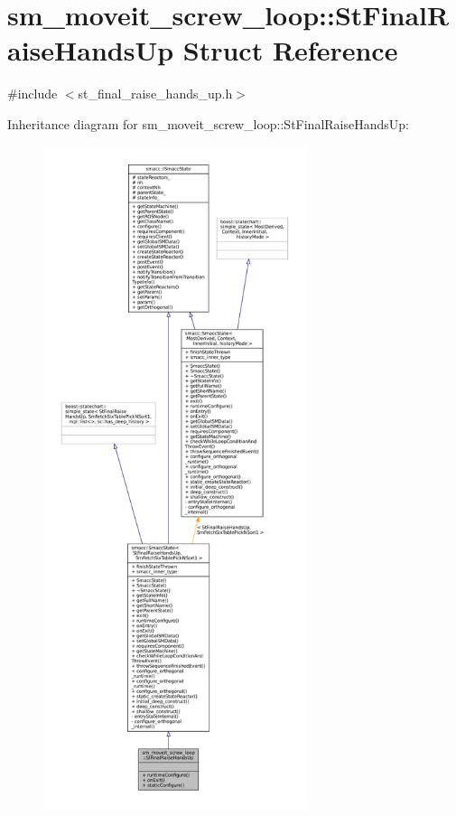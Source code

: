 \hypertarget{structsm__moveit__screw__loop_1_1StFinalRaiseHandsUp}{}\section{sm\+\_\+moveit\+\_\+screw\+\_\+loop\+:\+:St\+Final\+Raise\+Hands\+Up Struct Reference}
\label{structsm__moveit__screw__loop_1_1StFinalRaiseHandsUp}


{\ttfamily \#include $<$st\+\_\+final\+\_\+raise\+\_\+hands\+\_\+up.\+h$>$}



Inheritance diagram for sm\+\_\+moveit\+\_\+screw\+\_\+loop\+:\+:St\+Final\+Raise\+Hands\+Up\+:
\nopagebreak
\begin{figure}[H]
\begin{center}
\leavevmode
\includegraphics[height=550pt]{structsm__moveit__screw__loop_1_1StFinalRaiseHandsUp__inherit__graph}
\end{center}
\end{figure}


